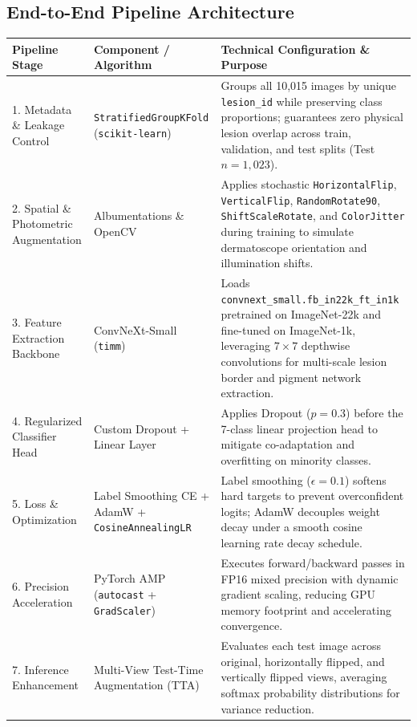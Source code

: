 \documentclass[12pt,a4paper]{article}
\begin{document}
\subsection{End-to-End Pipeline Architecture}
\begin{table}[h!]
\centering
\renewcommand{\arraystretch}{1.25}
\begin{tabularx}{\textwidth}{l l X}
\toprule
\textbf{Pipeline Stage} & \textbf{Component / Algorithm} & \textbf{Technical Configuration \& Purpose} \\
\midrule
1. Metadata \& Leakage Control & \texttt{StratifiedGroupKFold} (\texttt{scikit-learn}) & Groups all 10,015 images by unique \texttt{lesion\_id} while preserving class proportions; guarantees zero physical lesion overlap across train, validation, and test splits (Test $n = 1,023$). \\
2. Spatial \& Photometric Augmentation & Albumentations \& OpenCV & Applies stochastic \texttt{HorizontalFlip}, \texttt{VerticalFlip}, \texttt{RandomRotate90}, \texttt{ShiftScaleRotate}, and \texttt{ColorJitter} during training to simulate dermatoscope orientation and illumination shifts. \\
3. Feature Extraction Backbone & ConvNeXt-Small (\texttt{timm}) & Loads \texttt{convnext\_small.fb\_in22k\_ft\_in1k} pretrained on ImageNet-22k and fine-tuned on ImageNet-1k, leveraging $7\times 7$ depthwise convolutions for multi-scale lesion border and pigment network extraction. \\
4. Regularized Classifier Head & Custom Dropout + Linear Layer & Applies Dropout ($p = 0.3$) before the 7-class linear projection head to mitigate co-adaptation and overfitting on minority classes. \\
5. Loss \& Optimization & Label Smoothing CE + AdamW + \texttt{CosineAnnealingLR} & Label smoothing ($\epsilon = 0.1$) softens hard targets to prevent overconfident logits; AdamW decouples weight decay under a smooth cosine learning rate decay schedule. \\
6. Precision Acceleration & PyTorch AMP (\texttt{autocast} + \texttt{GradScaler}) & Executes forward/backward passes in FP16 mixed precision with dynamic gradient scaling, reducing GPU memory footprint and accelerating convergence. \\
7. Inference Enhancement & Multi-View Test-Time Augmentation (TTA) & Evaluates each test image across original, horizontally flipped, and vertically flipped views, averaging softmax probability distributions for variance reduction. \\
\bottomrule
\end{tabularx}
\end{table}
\end{document}
